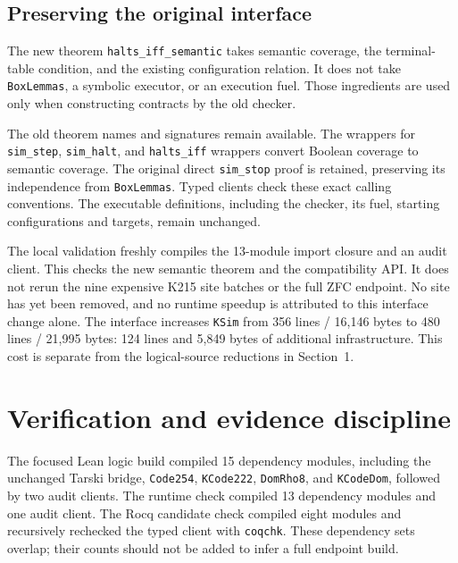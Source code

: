 \documentclass[11pt,letterpaper]{article}
\begin{document}
\subsection{Preserving the original interface}

The new theorem \texttt{halts\_iff\_semantic} takes semantic coverage, the
terminal-table condition, and the existing configuration relation. It does not
take \texttt{BoxLemmas}, a symbolic executor, or an execution fuel. Those
ingredients are used only when constructing contracts by the old checker.

The old theorem names and signatures remain available. The wrappers for
\texttt{sim\_step},
\texttt{sim\_halt}, and \texttt{halts\_iff} wrappers convert Boolean coverage
to semantic coverage. The original direct \texttt{sim\_stop} proof is retained,
preserving its independence from \texttt{BoxLemmas}. Typed clients check these exact calling
conventions. The executable definitions, including the checker, its fuel,
starting configurations and targets, remain unchanged.

The local validation freshly compiles the 13-module import closure and an audit
client. This checks the new semantic theorem and the compatibility API. It does
not rerun the nine expensive K215 site batches or the full ZFC endpoint. No site
has yet been removed, and no runtime speedup is attributed to this interface
change alone. The interface increases \texttt{KSim} from 356 lines / 16,146 bytes
to 480 lines / 21,995 bytes: 124 lines and 5,849 bytes of additional
infrastructure. This cost is separate from the logical-source reductions in
Section~1.

\section{Verification and evidence discipline}

The focused Lean logic build compiled 15 dependency modules, including the
unchanged Tarski bridge, \texttt{Code254}, \texttt{KCode222}, \texttt{DomRho8},
and \texttt{KCodeDom}, followed by two audit clients. The runtime check compiled
13 dependency modules and one audit client. The Rocq candidate check compiled
eight modules and recursively rechecked the typed client with \texttt{coqchk}.
These dependency sets overlap; their counts should not be added to infer a
full endpoint build.
\end{document}
